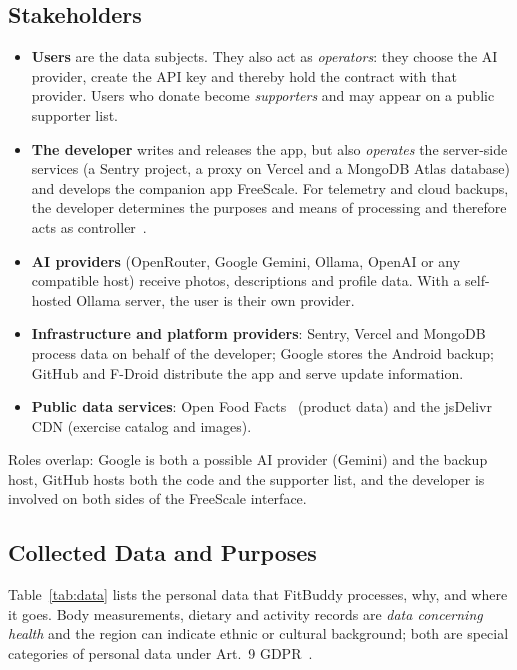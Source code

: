 \subsection{Stakeholders}
\begin{itemize}
  \item \textbf{Users} are the data subjects. They also act as \emph{operators}: they choose the
        AI provider, create the API key and thereby hold the contract with that provider. Users
        who donate become \emph{supporters} and may appear on a public supporter list.
  \item \textbf{The developer} writes and releases the app, but also \emph{operates} the
        server-side services (a Sentry project, a proxy on Vercel and a MongoDB Atlas database)
        and develops the companion app FreeScale. For telemetry and cloud backups, the developer
        determines the purposes and means of processing and therefore acts as
        controller~\cite{gdpr}.
  \item \textbf{AI providers} (OpenRouter, Google Gemini, Ollama, OpenAI or any compatible host)
        receive photos, descriptions and profile data. With a self-hosted Ollama server, the user
        is their own provider.
  \item \textbf{Infrastructure and platform providers}: Sentry, Vercel and MongoDB process data
        on behalf of the developer; Google stores the Android backup; GitHub and F-Droid
        distribute the app and serve update information.
  \item \textbf{Public data services}: Open Food Facts~\cite{off-api} (product data) and the
        jsDelivr CDN (exercise catalog and images).
\end{itemize}
Roles overlap: Google is both a possible AI provider (Gemini) and the backup host, GitHub hosts
both the code and the supporter list, and the developer is involved on both sides of the
FreeScale interface.

\subsection{Collected Data and Purposes}
Table~\ref{tab:data} lists the personal data that FitBuddy processes, why, and where it goes.
Body measurements, dietary and activity records are \emph{data concerning health} and the region
can indicate ethnic or cultural background; both are special categories of personal data under
Art.~9 GDPR~\cite{gdpr}.


